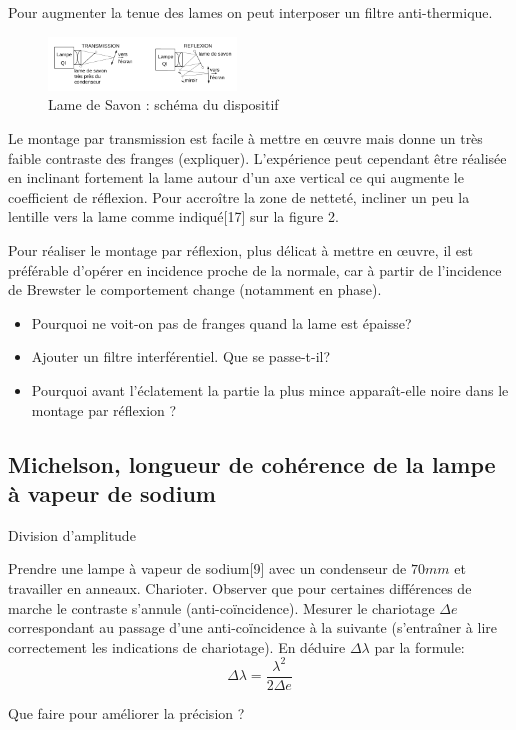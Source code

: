 \documentclass{article}%
\begin{document}
Pour augmenter la tenue des lames on peut interposer un filtre anti-thermique.

\begin{figure}
	\centerline{\includegraphics[width=5cm]{images-exp/Film_Savon.png}}
	\caption{Lame de Savon : schéma du dispositif}
\end{figure}
Le montage par transmission est facile à mettre en œuvre mais donne un très faible contraste des franges (expliquer). L'expérience peut cependant être réalisée en inclinant fortement la lame autour d'un axe vertical ce qui augmente le coefficient de réflexion. Pour accroître la zone de netteté, incliner un peu la lentille vers la lame comme indiqué[17] sur la figure 2.

Pour réaliser le montage par réflexion, plus délicat à mettre en œuvre, il est préférable d'opérer en incidence proche de la normale, car à partir de l'incidence de Brewster le comportement change (notamment en phase).

\begin{itemize}
	\item    Pourquoi ne voit-on pas de franges quand la lame est épaisse?
	\item    Ajouter un filtre interférentiel. Que se passe-t-il?
	\item    Pourquoi avant l'éclatement la partie la plus mince apparaît-elle noire dans le montage par réflexion ?
\end{itemize}

\subsection{Michelson, longueur de cohérence de la lampe à vapeur de sodium}
Division d'amplitude

Prendre une lampe à vapeur de sodium[9] avec un condenseur de $70 mm$ et travailler en anneaux. Charioter. Observer que pour certaines différences de marche le contraste s'annule (anti-coïncidence). Mesurer le chariotage $\Delta e$ correspondant au passage d'une anti-coïncidence à la suivante (s'entraîner à lire correctement les indications de chariotage). En déduire $\Delta \lambda$ par la formule:
\[\Delta \lambda = \frac{\lambda ^2}{2\Delta e}\]

Que faire pour améliorer la précision ?
\end{document}
